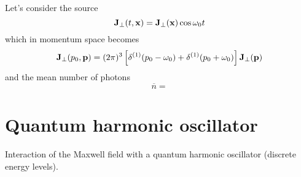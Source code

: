 \begin{example}
	Let's consider the source
	\begin{equation*}
		\vb{J}_\perp(t,\vb{x})
		=
		\vb{J}_\perp(\vb{x})
		\cos\omega_0 t
	\end{equation*}
	which in momentum space becomes
	\begin{equation*}
		\vb{J}_\perp(p_0,\vb{p})
		=
		(2\pi)^3
		\left[
			\delta^{(1)}(p_0-\omega_0)
			+
			\delta^{(1)}(p_0+\omega_0)
		\right]
		\vb{J}_\perp(\vb{p})
	\end{equation*}
	and the mean number of photons
	\begin{equation*}
		\overline{n}
		=
	\end{equation*}
\end{example}
\begin{example}[Bremsstrahlung]
	
\end{example}

\section{Quantum harmonic oscillator}

Interaction of the Maxwell field with a quantum harmonic oscillator (discrete energy levels).